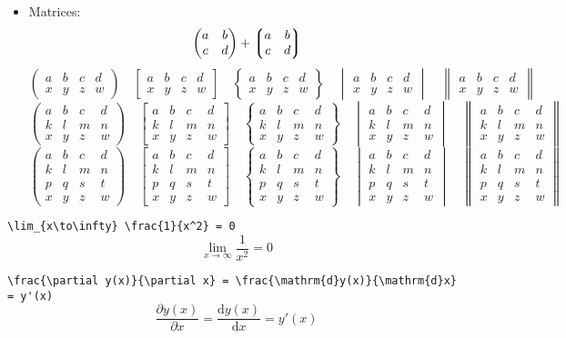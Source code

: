 \documentclass{article}
\def\MATRIXII{a & b & c & d \\ x & y & z & w}
\def\MATRIXIII{a & b & c & d \\ k & l & m & n \\ x & y & z & w}
\def\MATRIXIV{a & b & c & d \\ k & l & m & n \\ p & q & s & t \\ x & y & z & w}
\begin{document}
\begin{itemize}
  \item Matrices:
        \[ \mqty(a & b \\ c & d) + \mqty*(a & b \\ c & d) \]
        \[
          \begin{pmatrix} \MATRIXII  \end{pmatrix} \quad
          \begin{bmatrix} \MATRIXII  \end{bmatrix} \quad
          \begin{Bmatrix} \MATRIXII  \end{Bmatrix} \quad
          \begin{vmatrix} \MATRIXII  \end{vmatrix} \quad
          \begin{Vmatrix} \MATRIXII  \end{Vmatrix}
        \]
        \[
          \begin{pmatrix} \MATRIXIII \end{pmatrix} \quad
          \begin{bmatrix} \MATRIXIII \end{bmatrix} \quad
          \begin{Bmatrix} \MATRIXIII \end{Bmatrix} \quad
          \begin{vmatrix} \MATRIXIII \end{vmatrix} \quad
          \begin{Vmatrix} \MATRIXIII \end{Vmatrix}
        \]
        \[
          \begin{pmatrix} \MATRIXIV  \end{pmatrix} \quad
          \begin{bmatrix} \MATRIXIV  \end{bmatrix} \quad
          \begin{Bmatrix} \MATRIXIV  \end{Bmatrix} \quad
          \begin{vmatrix} \MATRIXIV  \end{vmatrix} \quad
          \begin{Vmatrix} \MATRIXIV  \end{Vmatrix}
        \]
\end{itemize}

\verb|\lim_{x\to\infty} \frac{1}{x^2} = 0|
\[ \lim_{x\to\infty} \frac{1}{x^2} = 0 \]

\verb|\frac{\partial y(x)}{\partial x} = \frac{\mathrm{d}y(x)}{\mathrm{d}x} = y'(x)|
\[ \frac{\partial y(x)}{\partial x} = \frac{\mathrm{d}y(x)}{\mathrm{d}x} = y'(x) \]
\end{document}

